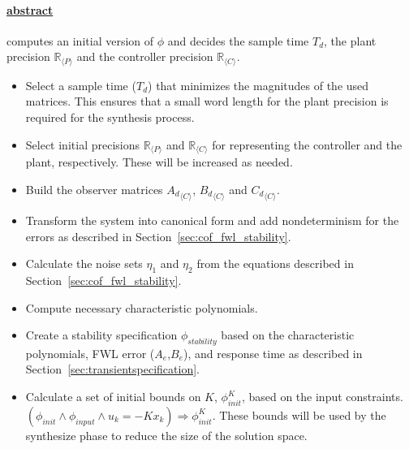 \documentclass[sigconf]{llncs}
\newcommand{\mat}[1]{{#1}}
\renewcommand{\vec}[1]{{#1}}
\begin{document}
\paragraph{\underline{{\sc abstract}}} computes an initial version of $\phi$
and decides the sample time $T_d$,
the plant precision $\mathbb{R}_{\langle P \rangle}$ and the controller precision
$\mathbb{R}_{\langle C \rangle}$.
%
\begin{itemize}
\item Select a sample time ($T_d$) that minimizes the magnitudes of the used matrices.
This ensures that a small word length for the plant precision is required for
the synthesis process.
\item Select initial precisions $\mathbb{R}_{\langle P \rangle}$ and $\mathbb{R}_{\langle C \rangle}$
  for representing the controller and the plant, respectively. These will be increased as needed.
\item Build the observer matrices ${\mat{A}_d}_{\langle C \rangle}$, ${\mat{B}_d}_{\langle C \rangle}$
and ${\mat{C}_d}_{\langle C \rangle}$. %
\item Transform the system into canonical form and add nondeterminism for the errors
as described in Section~\ref{sec:cof_fwl_stability}. 
\item Calculate the noise sets $\eta_1$ and $\eta_2$ from the equations
described in Section~\ref{sec:cof_fwl_stability}.
\item Compute necessary characteristic polynomials. 
\item Create a stability specification $\phi_{stability}$ based on the characteristic polynomials, FWL
error ($\mat{A}_e$,$\mat{B}_e$), and response time %
as described in Section~\ref{sec:transientspecification}.
\item Calculate a set of initial bounds on $\mat{K}$, $\phi_\mathit{init}^{K}$,
based on the input constraints.
$(\phi_\mathit{init} \wedge \phi_\mathit{input} \wedge u_k=-\mat{K} \vec{x}_k)
\Rightarrow \phi_\mathit{init}^{K}$.
These bounds will be used by the {\sc synthesize} phase to reduce the size of the solution space. 
\end{itemize}
\end{document}
